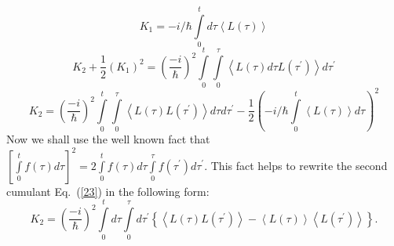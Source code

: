 \documentclass[12pt,twoside,a4paper]{report}
\begin{document}
\begin{equation} 
K_1
       =
          -  i/\hbar 
             \int\limits_0^t d\tau 
                 \left\langle 
                      L\left( \tau \right) 
                \right\rangle  \label{cum} 
\end{equation} 
\[ 
   K_2
+  \frac 12
   \left( 
      K_1
   \right)^2
              =
                   \left( \frac{-i}\hbar \right)^2
                   \int\limits_0^t 
                       \int\limits_0^\tau 
                           \left\langle 
                               L\left( \tau \right)
                      d\tau 
                      L\left( \tau ^{\prime }\right) 
                           \right\rangle 
                  d\tau ^{\prime }  
\] 
\begin{equation} 
K_2
      =
          \left( \frac{-i}\hbar \right)^2
          \int\limits_0^t
              \int\limits_0^\tau 
                   \left\langle 
                       L\left( \tau \right) 
                       L\left( \tau ^{\prime }\right) 
                  \right\rangle 
              d\tau 
          d\tau^{\prime }
       -  \frac 12
          \left( 
              -  i/\hbar 
                 \int\limits_0^t
                     \left\langle 
                         L\left( \tau \right) 
                     \right\rangle 
                d\tau 
          \right)^2  \label{23} 
\end{equation} 
Now we shall use the well known fact
that  
$%
\left[ 
    \int\limits_0^t
        f
        \left( 
            \tau 
        \right) 
    d\tau 
\right]^2           =   
                        2
                        \int\limits_0^t
                            f\left( \tau \right) 
                        d\tau 
                        \int\limits_0^\tau 
                            f\left( \tau ^{\prime }\right) 
                        d\tau ^{\prime }  
$. %
This fact 
helps  to rewrite 
the second cumulant Eq.~(\ref{23}) 
in the following form:  
\begin{equation} 
K_2
    =
       \left( \frac{-i}\hbar \right)^2
       \int\limits_0^t  d\tau 
           \int\limits_0^\tau d\tau^{\prime }
               \left\{ 
                    \left\langle 
                         L\left( \tau \right) 
                         L\left( \tau ^{\prime }\right) 
                    \right\rangle 
                 -  \left\langle 
                         L\left( \tau \right) 
                    \right\rangle 
                    \left\langle 
                         L\left( \tau ^{\prime }\right) 
                    \right\rangle 
               \right\}.  \label{25} 
\end{equation} 
\end{document}
